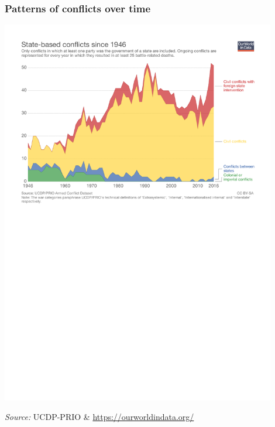 \documentclass[utf8, xcolor=dvipsnames]{beamer}
\begin{document}
\begin{frame}
\frametitle{Patterns of conflicts over time}
\centering

\includegraphics[width = 0.9\textwidth]{img/conflicts_over_time}

{\small \textit{Source:} UCDP-PRIO \& \url{https://ourworldindata.org/}}

\end{frame}
\end{document}
